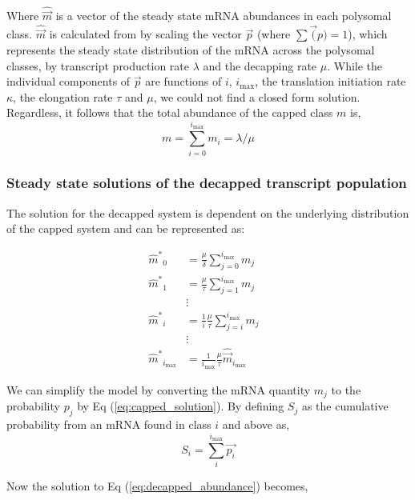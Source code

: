 \documentclass[10pt,letterpaper]{article}
\newcommand{\imax}{\ensuremath{{i_{\max}}}\xspace}
\newcommand{\mhat}{\ensuremath{\hat{m}}\xspace}
\newcommand{\mhatstar}{\ensuremath{\mhat^{*}}\xspace}
\newcommand{\mvec}{\ensuremath{\vec{m}}\xspace}
\newcommand{\mvechat}{\ensuremath{\hat{\mvec}}\xspace}
\newcommand{\msum}{\ensuremath{m}\xspace}
\begin{document}
Where \mvechat is a vector of the steady state mRNA abundances in each polysomal class.
\mvechat is calculated from by scaling  the vector $\vec{p}$ (where $\sum \vec(p) = 1$), which represents the steady state distribution of the mRNA across the polysomal classes, by transcript production rate $\lambda$ and the decapping rate $\mu$.
While the individual components of $\vec{p}$ are functions of $i$, \imax, the translation initiation rate $\kappa$, the elongation rate $\tau$ and $\mu$, we could not find a closed form solution.
Regardless, it follows that the total abundance of the capped class \msum is,
\begin{equation}\label{eq:capped_sum}
\msum = \sum_{i = 0} ^\imax m_i = \lambda/\mu
\end{equation}

\subsubsection*{Steady state solutions of the decapped transcript population}

The solution for the decapped system is dependent on the underlying distribution of the capped system and can be represented as:

\begin{align} 
\label{eq:decapped_abundance}
\mhatstar_0  &= \frac{\mu}{\delta}\sum_{j=0}^{\imax}m_{j} \nonumber \\
\mhatstar_1  &= \frac{\mu}{\tau}\sum_{j=1}^{\imax}m_{j}  \nonumber \\
& \vdots &  \\
\mhatstar_i  &= \frac{1}{i}\frac{\mu}{\tau}\sum_{j=i}^{\imax}m_{j}  \nonumber \\
& \vdots & \nonumber \\
\mhatstar_{\imax}  &= \frac{1}{\imax}\frac{\mu}{\tau} \mvechat_{\imax}   \nonumber
\end{align}

We can simplify the model by converting the mRNA quantity $m_{j}$ to the probability $p_{j}$ by Eq (\ref{eq:capped_solution}). By defining $S_{j}$ as the cumulative probability from an mRNA found in class $i$ and above as,
\begin{equation}
		S_{i} = \sum_{i}^{\imax}\vec{p_{i}}
\end{equation}

Now the solution to Eq (\ref{eq:decapped_abundance}) becomes,
\end{document}
